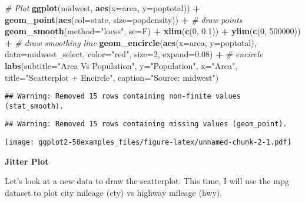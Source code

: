 \documentclass[a4paper]{article}
\newenvironment{Shaded}{\begin{snugshade}}{\end{snugshade}}
\newcommand{\KeywordTok}[1]{\textcolor[rgb]{0.13,0.29,0.53}{\textbf{#1}}}
\newcommand{\DataTypeTok}[1]{\textcolor[rgb]{0.13,0.29,0.53}{#1}}
\newcommand{\DecValTok}[1]{\textcolor[rgb]{0.00,0.00,0.81}{#1}}
\newcommand{\FloatTok}[1]{\textcolor[rgb]{0.00,0.00,0.81}{#1}}
\newcommand{\StringTok}[1]{\textcolor[rgb]{0.31,0.60,0.02}{#1}}
\newcommand{\CommentTok}[1]{\textcolor[rgb]{0.56,0.35,0.01}{\textit{#1}}}
\newcommand{\OperatorTok}[1]{\textcolor[rgb]{0.81,0.36,0.00}{\textbf{#1}}}
\newcommand{\NormalTok}[1]{#1}
\begin{document}
\begin{Shaded}
\begin{Highlighting}[]
\CommentTok{# Plot}
\KeywordTok{ggplot}\NormalTok{(midwest, }\KeywordTok{aes}\NormalTok{(}\DataTypeTok{x=}\NormalTok{area, }\DataTypeTok{y=}\NormalTok{poptotal)) }\OperatorTok{+}\StringTok{ }
\StringTok{  }\KeywordTok{geom_point}\NormalTok{(}\KeywordTok{aes}\NormalTok{(}\DataTypeTok{col=}\NormalTok{state, }\DataTypeTok{size=}\NormalTok{popdensity)) }\OperatorTok{+}\StringTok{   }\CommentTok{# draw points}
\StringTok{  }\KeywordTok{geom_smooth}\NormalTok{(}\DataTypeTok{method=}\StringTok{"loess"}\NormalTok{, }\DataTypeTok{se=}\NormalTok{F) }\OperatorTok{+}\StringTok{ }
\StringTok{  }\KeywordTok{xlim}\NormalTok{(}\KeywordTok{c}\NormalTok{(}\DecValTok{0}\NormalTok{, }\FloatTok{0.1}\NormalTok{)) }\OperatorTok{+}\StringTok{ }
\StringTok{  }\KeywordTok{ylim}\NormalTok{(}\KeywordTok{c}\NormalTok{(}\DecValTok{0}\NormalTok{, }\DecValTok{500000}\NormalTok{)) }\OperatorTok{+}\StringTok{   }\CommentTok{# draw smoothing line}
\StringTok{  }\KeywordTok{geom_encircle}\NormalTok{(}\KeywordTok{aes}\NormalTok{(}\DataTypeTok{x=}\NormalTok{area, }\DataTypeTok{y=}\NormalTok{poptotal), }
                \DataTypeTok{data=}\NormalTok{midwest_select, }
                \DataTypeTok{color=}\StringTok{"red"}\NormalTok{, }
                \DataTypeTok{size=}\DecValTok{2}\NormalTok{, }
                \DataTypeTok{expand=}\FloatTok{0.08}\NormalTok{) }\OperatorTok{+}\StringTok{   }\CommentTok{# encircle}
\StringTok{  }\KeywordTok{labs}\NormalTok{(}\DataTypeTok{subtitle=}\StringTok{"Area Vs Population"}\NormalTok{, }
       \DataTypeTok{y=}\StringTok{"Population"}\NormalTok{, }
       \DataTypeTok{x=}\StringTok{"Area"}\NormalTok{, }
       \DataTypeTok{title=}\StringTok{"Scatterplot + Encircle"}\NormalTok{, }
       \DataTypeTok{caption=}\StringTok{"Source: midwest"}\NormalTok{)}
\end{Highlighting}
\end{Shaded}

\begin{verbatim}
## Warning: Removed 15 rows containing non-finite values (stat_smooth).
\end{verbatim}

\begin{verbatim}
## Warning: Removed 15 rows containing missing values (geom_point).
\end{verbatim}

\texttt{[image: ggplot2-50examples\_files/figure-latex/unnamed-chunk-2-1.pdf]}
\newpage

\textbf{Jitter Plot}

Let's look at a new data to draw the scatterplot. This time, I will use
the mpg dataset to plot city mileage (cty) vs highway mileage (hwy).
\end{document}
